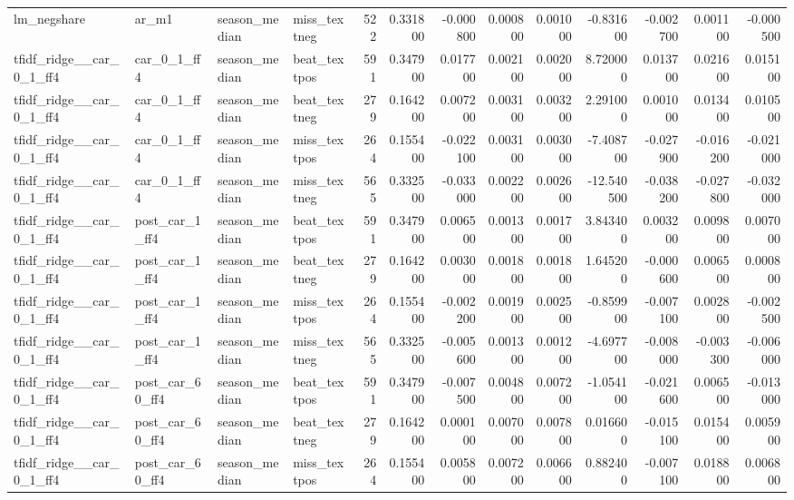\begin{table}
\begin{tabular}{llllrrrrrrrrr}
lm\_negshare & ar\_m1 & season\_median & miss\_textneg & 522 & 0.331800 & -0.000800 & 0.000800 & 0.001000 & -0.831600 & -0.002700 & 0.001100 & -0.000500 \\
tfidf\_ridge\_\_car\_0\_1\_ff4 & car\_0\_1\_ff4 & season\_median & beat\_textpos & 591 & 0.347900 & 0.017700 & 0.002100 & 0.002000 & 8.720000 & 0.013700 & 0.021600 & 0.015100 \\
tfidf\_ridge\_\_car\_0\_1\_ff4 & car\_0\_1\_ff4 & season\_median & beat\_textneg & 279 & 0.164200 & 0.007200 & 0.003100 & 0.003200 & 2.291000 & 0.001000 & 0.013400 & 0.010500 \\
tfidf\_ridge\_\_car\_0\_1\_ff4 & car\_0\_1\_ff4 & season\_median & miss\_textpos & 264 & 0.155400 & -0.022100 & 0.003100 & 0.003000 & -7.408700 & -0.027900 & -0.016200 & -0.021000 \\
tfidf\_ridge\_\_car\_0\_1\_ff4 & car\_0\_1\_ff4 & season\_median & miss\_textneg & 565 & 0.332500 & -0.033000 & 0.002200 & 0.002600 & -12.540500 & -0.038200 & -0.027800 & -0.032000 \\
tfidf\_ridge\_\_car\_0\_1\_ff4 & post\_car\_1\_ff4 & season\_median & beat\_textpos & 591 & 0.347900 & 0.006500 & 0.001300 & 0.001700 & 3.843400 & 0.003200 & 0.009800 & 0.007000 \\
tfidf\_ridge\_\_car\_0\_1\_ff4 & post\_car\_1\_ff4 & season\_median & beat\_textneg & 279 & 0.164200 & 0.003000 & 0.001800 & 0.001800 & 1.645200 & -0.000600 & 0.006500 & 0.000800 \\
tfidf\_ridge\_\_car\_0\_1\_ff4 & post\_car\_1\_ff4 & season\_median & miss\_textpos & 264 & 0.155400 & -0.002200 & 0.001900 & 0.002500 & -0.859900 & -0.007100 & 0.002800 & -0.002500 \\
tfidf\_ridge\_\_car\_0\_1\_ff4 & post\_car\_1\_ff4 & season\_median & miss\_textneg & 565 & 0.332500 & -0.005600 & 0.001300 & 0.001200 & -4.697700 & -0.008000 & -0.003300 & -0.006000 \\
tfidf\_ridge\_\_car\_0\_1\_ff4 & post\_car\_60\_ff4 & season\_median & beat\_textpos & 591 & 0.347900 & -0.007500 & 0.004800 & 0.007200 & -1.054100 & -0.021600 & 0.006500 & -0.013000 \\
tfidf\_ridge\_\_car\_0\_1\_ff4 & post\_car\_60\_ff4 & season\_median & beat\_textneg & 279 & 0.164200 & 0.000100 & 0.007000 & 0.007800 & 0.016600 & -0.015100 & 0.015400 & 0.005900 \\
tfidf\_ridge\_\_car\_0\_1\_ff4 & post\_car\_60\_ff4 & season\_median & miss\_textpos & 264 & 0.155400 & 0.005800 & 0.007200 & 0.006600 & 0.882400 & -0.007100 & 0.018800 & 0.006800 \\

\end{tabular}
\end{table}
